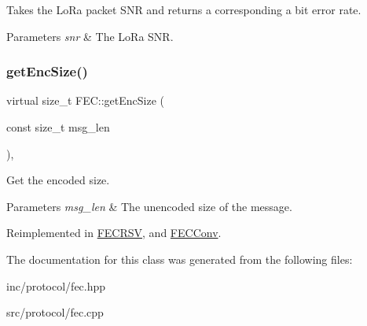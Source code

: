 Takes the Lo\+Ra packet S\+NR and returns a corresponding a bit error rate. 
\begin{DoxyParams}{Parameters}
{\em snr} & The Lo\+Ra S\+NR. \\
\hline
\end{DoxyParams}
\mbox{\label{classFEC_a6504a5f7d5e1344538c25ed5481d0adb}} 
\subsubsection{\texorpdfstring{get\+Enc\+Size()}{getEncSize()}}
{\footnotesize\ttfamily virtual size\+\_\+t F\+E\+C\+::get\+Enc\+Size (\begin{DoxyParamCaption}\item[{const size\+\_\+t}]{msg\+\_\+len }\end{DoxyParamCaption})\hspace{0.3cm}{\ttfamily [inline]}, {\ttfamily [virtual]}}

Get the encoded size. 
\begin{DoxyParams}{Parameters}
{\em msg\+\_\+len} & The unencoded size of the message. \\
\hline
\end{DoxyParams}


Reimplemented in \hyperlink{classFECRSV_a62fb01c152dad2e043ae75bbacfd928c}{F\+E\+C\+R\+SV}, and \hyperlink{classFECConv_a3b49acf69440d2677e3181513b9f3592}{F\+E\+C\+Conv}.



The documentation for this class was generated from the following files\+:\begin{DoxyCompactItemize}
\item 
inc/protocol/fec.\+hpp\item 
src/protocol/fec.\+cpp\end{DoxyCompactItemize}
